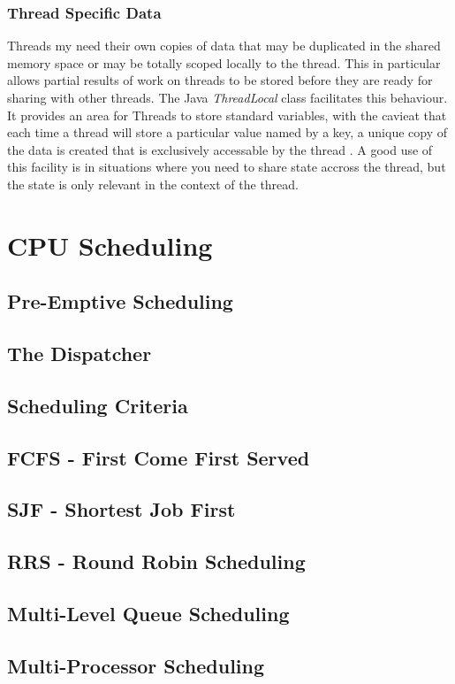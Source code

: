 \documentclass[10pt,a4paper]{article}
\begin{document}
\subsubsection{Thread Specific Data}
Threads my need their own copies of data that may be duplicated in the shared memory space or may be totally scoped locally to the thread. This in particular allows partial results of work on threads to be stored before they are ready for sharing with other threads. The Java {\it ThreadLocal } class facilitates this behaviour. It provides an area for Threads to store standard variables, with the cavieat that each time a thread will store a particular value named by a key, a unique copy of the data is created that is exclusively accessable by the thread \cite{threadlocal}. A good use of this facility is in situations where you need to share state accross the thread, but the state is only relevant in the context of the thread.  
\section{CPU Scheduling}
\subsection{Pre-Emptive Scheduling}
\subsection{The Dispatcher}
\subsection{Scheduling Criteria}
\subsection{FCFS - First Come First Served}
\subsection{SJF - Shortest Job First}
\subsection{RRS - Round Robin Scheduling}
\subsection{Multi-Level Queue Scheduling}
\subsection{Multi-Processor Scheduling}
\end{document}
